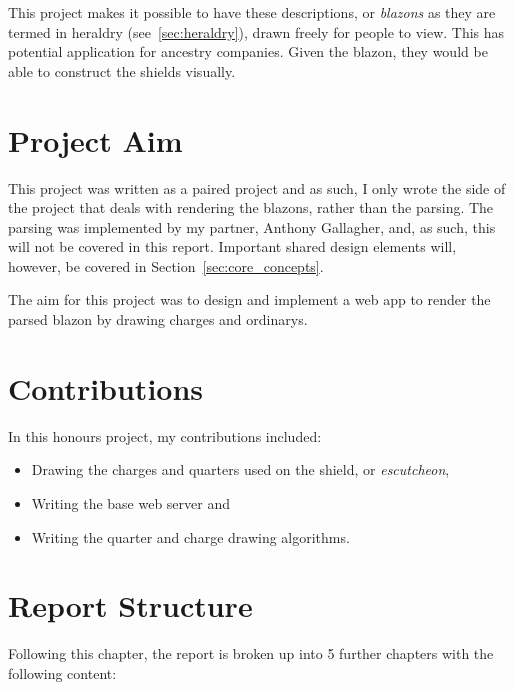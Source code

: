 \documentclass[nobib, a4paper, twoside, justified]{tufte-book}
\makeatletter
\newcommand{\charge}{\gls{charge}\@\xspace}
\newcommand{\charges}{\glspl{charge}\@\xspace}
\newcommand{\quarter}{\gls{quarter}\@\xspace}
\newcommand{\quarters}{\glspl{quarter}\@\xspace}
\newcommand{\blazon}{\gls{blazon}\@\xspace}
\newcommand{\blazons}{\glspl{blazon}\@\xspace}
\makeatother
\begin{document}
This project makes it possible to have these descriptions, or \textit{\blazons} as they are termed
in heraldry (see~\ref{sec:heraldry}), drawn freely for people to view. This has potential
application for ancestry companies. Given the \blazon, they would be able to construct the shields
visually.

\section{Project Aim}%
\label{sec:project_aim}

This project was written as a paired project and as such, I only wrote the side of the project that
deals with rendering the \blazons, rather than the parsing. The parsing was implemented by my
partner, Anthony Gallagher, and, as such, this will not be covered in this report. Important shared
design elements will, however, be covered in Section~\ref{sec:core_concepts}.

The aim for this project was to design and implement a web app to render the parsed \blazon by
drawing \charges and \glspl{ordinary}.

\section{Contributions}%
\label{sec:contributions}

In this honours project, my contributions included:

\begin{itemize}
  \item Drawing the \charges and \quarters used on the shield, or \textit{\gls{escutcheon}},
  \item Writing the base web server and
  \item Writing the \quarter and \charge drawing algorithms.
\end{itemize}

\section{Report Structure}%
\label{sec:report_structure}

Following this chapter, the report is broken up into 5 further chapters with the following content:
\end{document}

